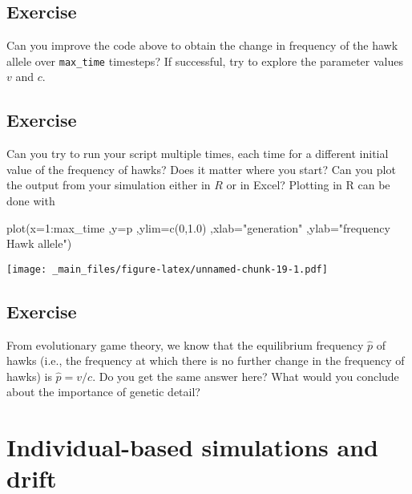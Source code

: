 \documentclass[
]{book}
\newenvironment{Shaded}{\begin{snugshade}}{\end{snugshade}}
\newcommand{\AttributeTok}[1]{\textcolor[rgb]{0.77,0.63,0.00}{#1}}
\newcommand{\DecValTok}[1]{\textcolor[rgb]{0.00,0.00,0.81}{#1}}
\newcommand{\FloatTok}[1]{\textcolor[rgb]{0.00,0.00,0.81}{#1}}
\newcommand{\FunctionTok}[1]{\textcolor[rgb]{0.00,0.00,0.00}{#1}}
\newcommand{\NormalTok}[1]{#1}
\newcommand{\SpecialCharTok}[1]{\textcolor[rgb]{0.00,0.00,0.00}{#1}}
\newcommand{\StringTok}[1]{\textcolor[rgb]{0.31,0.60,0.02}{#1}}
\begin{document}
\hypertarget{exercise-3}{%
\section{Exercise}\label{exercise-3}}

Can you improve the code above to obtain the change in frequency of the hawk allele over \texttt{max\_time} timesteps? If successful, try to explore the parameter values \(v\) and \(c\).

\hypertarget{exercise-4}{%
\section{Exercise}\label{exercise-4}}

Can you try to run your script multiple times, each time for a different initial value of the frequency of hawks? Does it matter where you start? Can you plot the output from your simulation either in \(R\) or in Excel?
Plotting in R can be done with

\begin{Shaded}
\begin{Highlighting}[]
\FunctionTok{plot}\NormalTok{(}\AttributeTok{x=}\DecValTok{1}\SpecialCharTok{:}\NormalTok{max\_time}
\NormalTok{     ,}\AttributeTok{y=}\NormalTok{p}
\NormalTok{     ,}\AttributeTok{ylim=}\FunctionTok{c}\NormalTok{(}\DecValTok{0}\NormalTok{,}\FloatTok{1.0}\NormalTok{)}
\NormalTok{     ,}\AttributeTok{xlab=}\StringTok{"generation"}
\NormalTok{     ,}\AttributeTok{ylab=}\StringTok{"frequency Hawk allele"}\NormalTok{)}
\end{Highlighting}
\end{Shaded}

\texttt{[image: \_main\_files/figure-latex/unnamed-chunk-19-1.pdf]}

\hypertarget{exercise-5}{%
\section{Exercise}\label{exercise-5}}

From evolutionary game theory, we know that the equilibrium frequency \(\hat{p}\) of hawks (i.e., the frequency at which there is no further change in the frequency of hawks) is \(\hat{p} = v/c\). Do you get the same answer here? What would you conclude about the importance of genetic detail?

\hypertarget{individual-based-simulations-and-drift}{%
\chapter{Individual-based simulations and drift}\label{individual-based-simulations-and-drift}}
\end{document}
